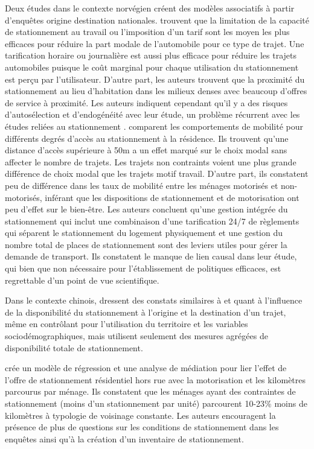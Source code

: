     Deux études dans le contexte norvégien \parencite{christiansen_parking_2017,christiansen_household_2017} créent des modèles associatifs à partir d'enquêtes origine destination nationales. \textcite{christiansen_parking_2017} trouvent que la limitation de la capacité de stationnement au travail ou l'imposition d'un tarif sont les moyen les plus efficaces pour réduire la part modale de l'automobile pour ce type de trajet. Une tarification horaire ou journalière est aussi plus efficace pour réduire les trajets automobiles puisque le coût marginal pour chaque utilisation du stationnement est perçu par l'utilisateur. D'autre part, les auteurs trouvent que la proximité du stationnement au lieu d'habitation dans les milieux denses avec beaucoup d'offres de service à proximité. Les auteurs indiquent cependant qu'il y a des risques d'autosélection et d'endogénéité avec leur étude, un problème récurrent avec les études reliées au stationnement \parencite{inci_review_2015}. \textcite{christiansen_household_2017} comparent les comportements de mobilité pour différents degrés d'accès au stationnement à la résidence. Ils trouvent qu'une distance d'accès supérieure à 50m a un effet marqué sur le choix modal sans affecter le nombre de trajets. Les trajets non contraints voient une plus grande différence de choix modal que les trajets motif travail. D'autre part, ils constatent peu de différence dans les taux de mobilité entre les ménages motorisés et non-motorisés, inférant que les dispositions de stationnement et de motorisation ont peu d'effet sur le bien-être. Les auteurs concluent qu'une gestion intégrée du stationnement qui inclut une combinaison d'une tarification 24/7 de règlements qui séparent le stationnement du logement physiquement et une gestion du nombre total de places de stationnement sont des leviers utiles pour gérer la demande de transport. Ils constatent le manque de lien causal dans leur étude, qui bien que non nécessaire pour l'établissement de politiques efficaces, est regrettable d'un point de vue scientifique.\par 
    Dans le contexte chinois, \textcite{yin_built_2018} dressent des constats similaires à \textcite{christiansen_household_2017} et \textcite{christiansen_parking_2017} quant à l'influence de la disponibilité du stationnement à l'origine et la destination d'un trajet, même en contrôlant pour l'utilisation du territoire et les variables sociodémographiques, mais utilisent seulement des mesures agrégées de disponibilité totale de stationnement.\par
    \textcite{currans_households_2023} crée un modèle de régression et une analyse de médiation pour lier l'effet de l'offre de stationnement résidentiel hors rue avec la motorisation et les kilomètres parcourus par ménage. Ils constatent que les ménages ayant des contraintes de stationnement (moins d'un stationnement par unité) parcourent 10-23\% moins de kilomètres à typologie de voisinage constante. Les auteurs encouragent la présence de plus de questions sur les conditions de stationnement dans les enquêtes ainsi qu'à la création d'un inventaire de stationnement. \par
